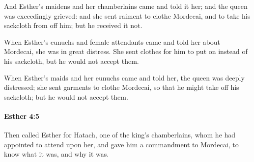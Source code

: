 			\begin{versebox}
					\item[BHS] 
					\item[LXX] 
					\item[ASV] And Esther's maidens and her chamberlains came and told it her; and the queen was exceedingly grieved: and she sent raiment to clothe Mordecai, and to take his sackcloth from off him; but he received it not.
					\item[NIV] When Esther’s eunuchs and female attendants came and told her about Mordecai, she was in great distress. She sent clothes for him to put on instead of his sackcloth, but he would not accept them.
					\item[NRSV] When Esther’s maids and her eunuchs came and told her, the queen was deeply distressed; she sent garments to clothe Mordecai, so that he might take off his sackcloth; but he would not accept them.
			\end{versebox}

		\paragraph{Esther 4:5} %
			\label{ESTHER-4-5}

			Then called Esther for Hatach, one of the king’s chamberlains, whom he had appointed to attend upon her, and gave him a commandment to Mordecai, to know what it was, and why it was.

